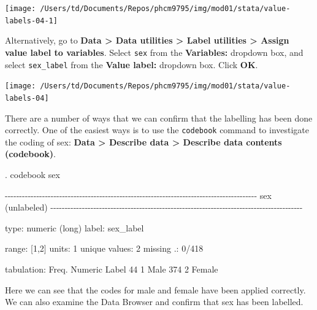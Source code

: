 \documentclass[
]{memoir}
\newenvironment{Shaded}{\begin{snugshade}}{\end{snugshade}}
\newcommand{\NormalTok}[1]{#1}
\begin{document}
\texttt{[image: /Users/td/Documents/Repos/phcm9795/img/mod01/stata/value-labels-04-1]}

Alternatively, go to \textbf{Data \textgreater{} Data utilities \textgreater{} Label utilities \textgreater{} Assign value label to variables}. Select \texttt{sex} from the \textbf{Variables:} dropdown box, and select \texttt{sex\_label} from the \textbf{Value label:} dropdown box. Click \textbf{OK}.

\texttt{[image: /Users/td/Documents/Repos/phcm9795/img/mod01/stata/value-labels-04]}

There are a number of ways that we can confirm that the labelling has been done correctly. One of the easiest ways is to use the \texttt{codebook} command to investigate the coding of sex: \textbf{Data \textgreater{} Describe data \textgreater{} Describe data contents (codebook)}.

\begin{Shaded}
\begin{Highlighting}[]
\NormalTok{. codebook sex}

\NormalTok{{-}{-}{-}{-}{-}{-}{-}{-}{-}{-}{-}{-}{-}{-}{-}{-}{-}{-}{-}{-}{-}{-}{-}{-}{-}{-}{-}{-}{-}{-}{-}{-}{-}{-}{-}{-}{-}{-}{-}{-}{-}{-}{-}{-}{-}{-}{-}{-}{-}{-}{-}{-}{-}{-}{-}{-}{-}{-}{-}{-}{-}{-}{-}{-}{-}{-}{-}{-}{-}{-}{-}{-}{-}{-}{-}{-}{-}{-}{-}{-}{-}{-}{-}{-}{-}{-}{-}{-}}
\NormalTok{sex                                                                          (unlabeled)}
\NormalTok{{-}{-}{-}{-}{-}{-}{-}{-}{-}{-}{-}{-}{-}{-}{-}{-}{-}{-}{-}{-}{-}{-}{-}{-}{-}{-}{-}{-}{-}{-}{-}{-}{-}{-}{-}{-}{-}{-}{-}{-}{-}{-}{-}{-}{-}{-}{-}{-}{-}{-}{-}{-}{-}{-}{-}{-}{-}{-}{-}{-}{-}{-}{-}{-}{-}{-}{-}{-}{-}{-}{-}{-}{-}{-}{-}{-}{-}{-}{-}{-}{-}{-}{-}{-}{-}{-}{-}{-}}

\NormalTok{                  type:  numeric (long)}
\NormalTok{                 label:  sex\_label}

\NormalTok{                 range:  [1,2]                        units:  1}
\NormalTok{         unique values:  2                        missing .:  0/418}

\NormalTok{            tabulation:  Freq.   Numeric  Label}
\NormalTok{                            44         1  Male}
\NormalTok{                           374         2  Female}
\end{Highlighting}
\end{Shaded}

Here we can see that the codes for male and female have been applied correctly. We can also examine the Data Browser and confirm that sex has been labelled.
\end{document}
